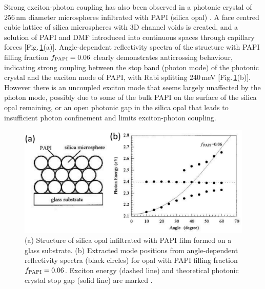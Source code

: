 Strong exciton-photon coupling has also been observed in a photonic crystal of 256\,nm diameter microspheres infiltrated with PAPI (silica opal) \cite{Sumioka2001}. A face centred cubic lattice of silica microspheres with 3D channel voids is created, and a solution of PAPI and DMF introduced into continuous spaces through capillary forces [Fig.\,\ref{2Fig21}(a)]. Angle-dependent reflectivity spectra of the structure with PAPI filling fraction $f_{\textnormal{PAPI}}=0.06$ clearly demonstrates anticrossing behaviour, indicating strong coupling between the stop band (photon mode) of the photonic crystal and the exciton mode of PAPI, with Rabi splitting 240\,meV [Fig.\,\ref{2Fig21}(b)]. However there is an uncoupled exciton mode that seems largely unaffected by the photon mode, possibly due to some of the bulk PAPI on the surface of the silica opal remaining, or an open photonic gap in the silica opal that leads to insufficient photon confinement and limits exciton-photon coupling. 
\begin{figure}[h!]
\centering
\includegraphics[width=\textwidth]{Fig21}
\caption{(a) Structure of silica opal infiltrated with PAPI film formed on a glass substrate. (b) Extracted mode positions from angle-dependent reflectivity spectra (black circles) for opal with PAPI filling fraction $f_{\textnormal{PAPI}}=0.06$. Exciton energy (dashed line) and theoretical photonic crystal stop gap (solid line) are marked \cite{Sumioka2001}.}
\label{2Fig21}
\end{figure}

